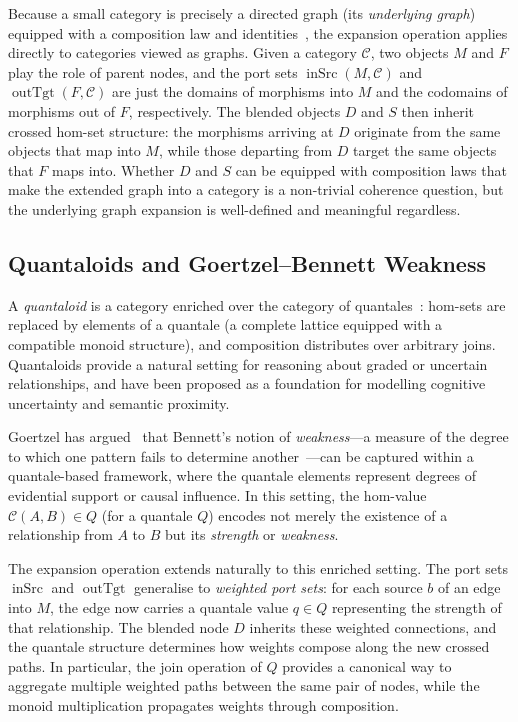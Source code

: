 \documentclass[11pt, a4paper]{article}
\theoremstyle{definition}
\theoremstyle{plain}
\theoremstyle{remark}
\newcommand{\inSrc}{\operatorname{inSrc}}
\newcommand{\outTgt}{\operatorname{outTgt}}
\begin{document}
Because a small category is precisely a directed graph (its \emph{underlying
graph}) equipped with a composition law and identities~\cite{maclane1998}, the
expansion operation applies directly to categories viewed as graphs.  Given a
category $\mathcal{C}$, two objects $M$ and $F$ play the role of parent nodes,
and the port sets $\inSrc(M, \mathcal{C})$ and $\outTgt(F, \mathcal{C})$ are
just the domains of morphisms into $M$ and the codomains of morphisms out of
$F$, respectively.  The blended objects $D$ and $S$ then inherit crossed
hom-set structure: the morphisms arriving at $D$ originate from the same
objects that map into $M$, while those departing from $D$ target the same
objects that $F$ maps into.  Whether $D$ and $S$ can be equipped with
composition laws that make the extended graph into a category is a non-trivial
coherence question, but the underlying graph expansion is well-defined and
meaningful regardless.

\subsection*{Quantaloids and Goertzel--Bennett Weakness}

A \emph{quantaloid} is a category enriched over the category of
quantales~\cite{rosenthal1996}: hom-sets are replaced by elements of a quantale
(a complete lattice equipped with a compatible monoid structure), and
composition distributes over arbitrary joins.  Quantaloids provide a natural
setting for reasoning about graded or uncertain relationships, and have been
proposed as a foundation for modelling cognitive uncertainty and semantic
proximity.

Goertzel has argued~\cite{goertzel2023} that Bennett's notion of
\emph{weakness}---a measure of the degree to which one pattern fails to
determine another~\cite{bennett1961}---can be captured within a quantale-based
framework, where the quantale elements represent degrees of evidential support
or causal influence.  In this setting, the hom-value $\mathcal{C}(A, B) \in Q$
(for a quantale $Q$) encodes not merely the existence of a relationship from
$A$ to $B$ but its \emph{strength} or \emph{weakness}.

The expansion operation extends naturally to this enriched setting.  The port
sets $\inSrc$ and $\outTgt$ generalise to \emph{weighted port sets}: for each
source $b$ of an edge into $M$, the edge now carries a quantale value $q \in
Q$ representing the strength of that relationship.  The blended node $D$
inherits these weighted connections, and the quantale structure determines how
weights compose along the new crossed paths.  In particular, the join operation
of $Q$ provides a canonical way to aggregate multiple weighted paths between
the same pair of nodes, while the monoid multiplication propagates weights
through composition.
\end{document}
